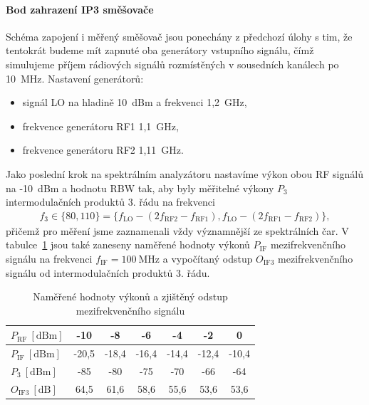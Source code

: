 \documentclass[11pt,a4paper]{article}
\begin{document}
\paragraph*{Bod zahrazení IP3 směšovače} Schéma zapojení i měřený směšovač jsou ponechány z předchozí úlohy s tim, že tentokrát budeme mít zapnuté oba generátory vstupního signálu, čímž simulujeme příjem rádiových signálů rozmístěných v sousedních kanálech po 10~MHz. Nastavení generátorů:
\begin{itemize}
    \item signál LO na hladině 10~dBm a frekvenci 1,2~GHz,
    \item frekvence generátoru RF1 1,1~GHz,
    \item frekvence generátoru RF2 1,11~GHz.
\end{itemize}
Jako poslední krok na spektrálním analyzátoru nastavíme výkon obou RF signálů na -10~dBm a hodnotu RBW tak, aby byly měřitelné výkony $P_3$ intermodulačních produktů 3. řádu na frekvenci
\begin{align*}
    f_3 \in \{80,110\} = \{f_{\mathrm{LO}} - (2f_{\mathrm{RF2}} - f_{\mathrm{RF1}}), f_{\mathrm{LO}} - (2f_{\mathrm{RF1}} - f_{\mathrm{RF2}})\},
\end{align*}
přičemž pro měření jsme zaznamenali vždy významnější ze spektrálních čar. V tabulce~\ref{table:task2-data} jsou také zaneseny naměřené hodnoty výkonů $P_{\mathrm{IF}}$ mezifrekvenčního signálu na frekvenci $f_{\mathrm{IF}} = 100 \ \mathrm{MHz}$ a vypočítaný odstup $O_{\mathrm{IF3}}$ mezifrekvenčního signálu od intermodulačních produktů 3. řádu.
\begin{table}[!ht]
    \centering
    \begin{tabular}{| l || c | c | c | c | c | c |}
        \hline
        $P_{\mathrm{RF}} \ [\mathrm{dBm}]$ & -10 & -8 & -6 & -4 & -2 & 0\\
        \hline
        $P_{\mathrm{IF}} \ [\mathrm{dBm}]$ & -20,5 & -18,4 & -16,4 & -14,4 & -12,4 & -10,4\\
        \hline
        $P_3 \ [\mathrm{dBm}]$ & -85 & -80 & -75 & -70 & -66 & -64\\
        \hline\hline
        $O_{\mathrm{IF3}} \ [\mathrm{dB}]$ & 64,5 & 61,6 & 58,6 & 55,6 & 53,6 & 53,6\\
        \hline
    \end{tabular}
    \caption{Naměřené hodnoty výkonů a zjištěný odstup mezifrekvenčního signálu}
    \label{table:task2-data}
\end{table}
\end{document}
